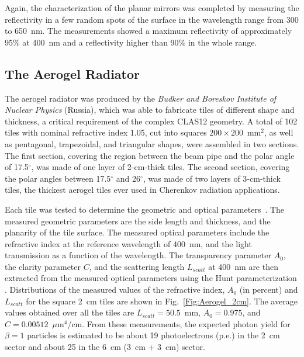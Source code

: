 \documentclass[5p,times,twocolumn]{elsarticle}
\begin{document}
Again, the characterization of the planar mirrors was completed by measuring the reflectivity in a few random spots of
the surface in the wavelength range from 300 to 650~nm. The measurements showed a maximum reflectivity of
approximately 95\% at 400~nm and a reflectivity higher than 90\% in the whole range.

\subsection{The Aerogel Radiator}

The aerogel radiator was produced by the {\it Budker and Boreskov Institute of Nuclear Physics} (Russia), which was
able to fabricate tiles of different shape and thickness, a critical requirement of the complex CLAS12 geometry.
A total of 102 tiles with nominal refractive index 1.05, cut into squares $200 \times 200$~mm$^2$, as well as
pentagonal, trapezoidal, and triangular shapes, were assembled in two sections. The first section, covering the region
between the beam pipe and the polar angle of 17.5$^\circ$, was made of one layer of 2-cm-thick tiles. The second
section, covering the polar angles between 17.5$^\circ$ and 26$^\circ$, was made of two layers of 3-cm-thick tiles, the
thickest aerogel tiles ever used in Cherenkov radiation applications.

Each tile was tested to determine the geometric and optical parameters~\cite{RICH:RICH2016mc}. The measured
geometric parameters are the side length and thickness, and the planarity of the tile surface. The measured optical
parameters include the refractive index at the reference wavelength of 400~nm, and the light transmission as a
function of the wavelength. The transparency parameter $A_0$, the clarity parameter $C$, and the scattering length
$L_{scatt}$ at 400~nm are then extracted from the measured optical parameters using the Hunt parameterization
\cite{Hunt}. Distributions of the measured values of the refractive index, $A_0$ (in percent) and $L_{scatt}$ for the
square 2~cm tiles are shown in Fig.~\ref{Fig:Aerogel_2cm}. The average values obtained over all the tiles are
$L_{scatt} = 50.5$~mm, $A_0 = 0.975$, and $C = 0.00512$~$\mu$m$^4$/cm. From these measurements, the expected
photon yield for $\beta=1$ particles is estimated to be about 19 photoelectrons (p.e.) in the 2~cm sector and about 25
in the 6~cm (3~cm + 3~cm) sector.
\end{document}
